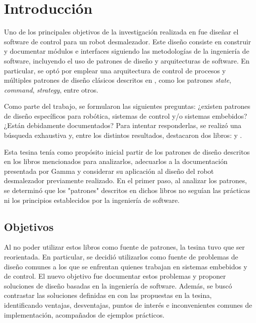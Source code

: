 \chapter{Introducción}

Uno de los principales objetivos de la investigación realizada en \cite{laura} fue diseñar el software de control para un robot desmalezador. Este diseño consiste en construir y documentar módulos e interfaces siguiendo las metodologías de la ingeniería de software, incluyendo el uso de patrones de diseño y arquitecturas de software. En particular, se optó por emplear una arquitectura de control de procesos \cite[pág. 27]{ShawGarlan1996} y múltiples patrones de diseño clásicos descritos en \cite{Gamma:1995:DPE:186897}, como los patrones \textit{state}, \textit{command}, \textit{strategy}, entre otros.

Como parte del trabajo, se formularon las siguientes preguntas: ¿existen patrones de diseño específicos para robótica, sistemas de control y/o sistemas embebidos? ¿Están debidamente documentados? Para intentar responderlas, se realizó una búsqueda exhaustiva y, entre los distintos resultados, destacaron dos libros: \cite{douglass} y \cite{elecia-embedded}.

Esta tesina tenía como propósito inicial partir de los patrones de diseño descritos en los libros mencionados para analizarlos, adecuarlos a la documentación presentada por Gamma y considerar su aplicación al diseño del robot desmalezador previamente realizado. En el primer paso, al analizar los patrones, se determinó que los "patrones" descritos en dichos libros no seguían las prácticas ni los principios establecidos por la ingeniería de software.

\section*{Objetivos}

Al no poder utilizar estos libros como fuente de patrones, la tesina tuvo que ser reorientada. En particular, se decidió utilizarlos como fuente de problemas de diseño comunes a los que se enfrentan quienes trabajan en sistemas embebidos y de control. El nuevo objetivo fue documentar estos problemas y proponer soluciones de diseño basadas en la ingeniería de software. Además, se buscó contrastar las soluciones definidas en \cite{douglass} con las propuestas en la tesina, identificando ventajas, desventajas, puntos de interés e inconvenientes comunes de implementación, acompañados de ejemplos prácticos.

